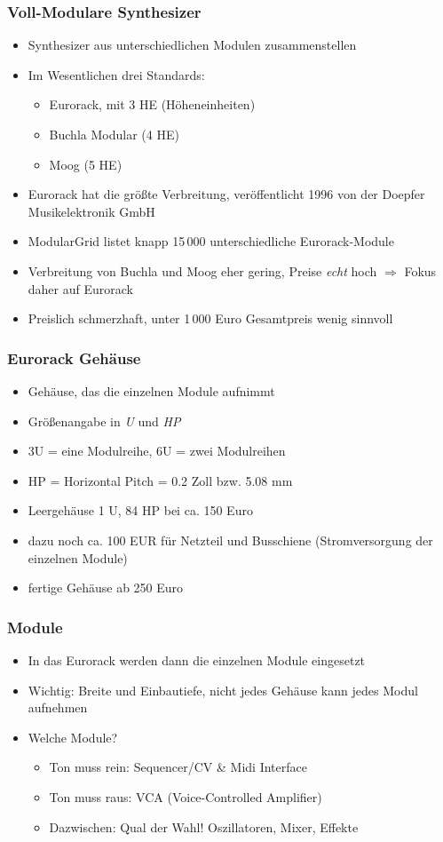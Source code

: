 \documentclass[11pt,ngerman]{beamer}
\begin{document}
\begin{frame}
\frametitle{Voll-Modulare Synthesizer}

\begin{itemize}
\item Synthesizer aus unterschiedlichen Modulen zusammenstellen
\item Im Wesentlichen drei Standards:

\begin{itemize}
	\item Eurorack, mit 3 HE (Höheneinheiten)
	\item Buchla Modular (4 HE)
	\item Moog (5 HE)
\end{itemize}
\item Eurorack hat die größte Verbreitung, veröffentlicht 1996 von der Doepfer Musikelektronik GmbH
\item ModularGrid listet knapp 15\,000 unterschiedliche Eurorack-Module
\item Verbreitung von Buchla und Moog eher gering, Preise \textit{echt} hoch $\Rightarrow$ Fokus daher auf Eurorack
\item Preislich schmerzhaft, unter 1\,000 Euro Gesamtpreis wenig sinnvoll
\end{itemize}
\end{frame} 

\begin{frame}
\frametitle{Eurorack Gehäuse}

\begin{itemize}
\item Gehäuse, das die einzelnen Module aufnimmt
\item Größenangabe in \textit{U} und \textit{HP}
\item 3U = eine Modulreihe, 6U = zwei Modulreihen
\item HP = Horizontal Pitch = 0.2 Zoll bzw. 5.08 mm
\item Leergehäuse 1 U, 84 HP bei ca. 150 Euro
\item dazu noch ca. 100 EUR für Netzteil und Busschiene (Stromversorgung der einzelnen Module)
\item fertige Gehäuse ab 250 Euro
\end{itemize}
\end{frame}

\begin{frame}
\frametitle{Module}

\begin{itemize}
\item In das Eurorack werden dann die einzelnen Module eingesetzt
\item Wichtig: Breite und Einbautiefe, nicht jedes Gehäuse kann jedes Modul aufnehmen
\item Welche Module? 
\begin{itemize}
	\item Ton muss rein: Sequencer/CV \& Midi Interface
	\item Ton muss raus: VCA (Voice-Controlled Amplifier)
	\item Dazwischen: Qual der Wahl! Oszillatoren, Mixer, Effekte
\end{itemize}
\end{itemize}
\end{frame}
\end{document}
